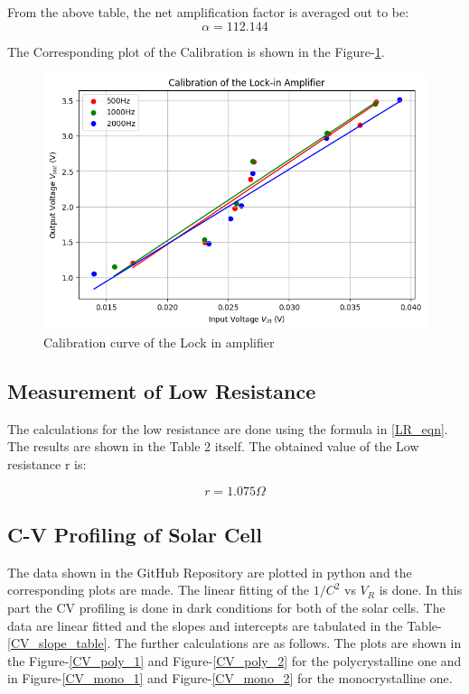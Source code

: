 \documentclass{article}
\begin{document}
\begin{multicols}{2}
From the above table, the net amplification factor is averaged out to be:
\begin{equation}
    \alpha  = 112.144
\end{equation}

The Corresponding plot of the Calibration is shown in the Figure-\ref{CAL_plot}.



\begin{figure}[H]
    \centering
    \includegraphics[width=\columnwidth]{Images/CAL_plot.png}
    \caption{Calibration curve of the Lock in amplifier}
    \label{CAL_plot}
\end{figure}

\subsection{Measurement of Low Resistance}
The calculations for the low resistance are done using the formula in \ref{LR_eqn}. The results are shown in the Table 2 itself. The obtained value of the Low resistance r is:

\begin{equation}
    r=1.075\Omega
\end{equation}

\subsection{C-V Profiling of Solar Cell}

The data shown in the GitHub Repository are plotted in python and the corresponding plots are made. The linear fitting of the $1/C^2$ vs $V_R$ is done. In this part the CV profiling is done in dark conditions for both of the solar cells. The data are linear fitted and the slopes and intercepts are tabulated in the Table-\ref{CV_slope_table}. The further calculations are as follows. The plots are shown in the Figure-\ref{CV_poly_1} and Figure-\ref{CV_poly_2} for the polycrystalline one and in Figure-\ref{CV_mono_1} and Figure-\ref{CV_mono_2} for the monocrystalline one.



\end{multicols}
\end{document}
